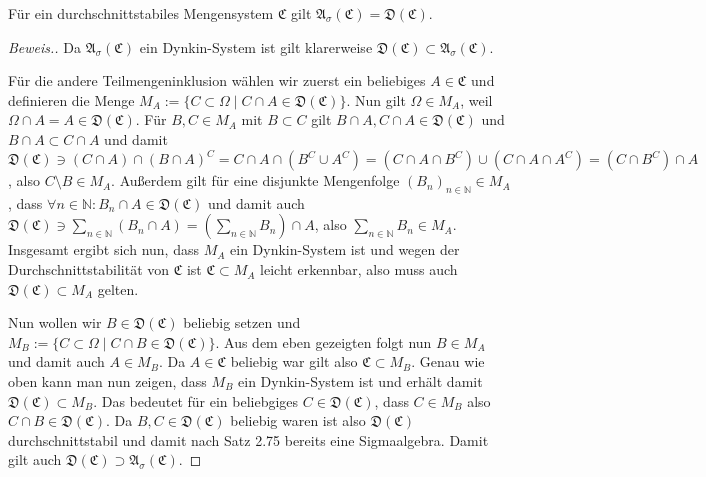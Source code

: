 \begin{lemma}
    Für ein durchschnittstabiles Mengensystem $\mathfrak{C}$ gilt $\mathfrak{A}_\sigma(\mathfrak{C})=\mathfrak{D}(\mathfrak{C})$.
\end{lemma}

\begin{proof}[Beweis.]
    Da $\mathfrak{A}_\sigma(\mathfrak{C})$ ein Dynkin-System ist gilt klarerweise $\mathfrak{D}(\mathfrak{C})\subset \mathfrak{A}_\sigma(\mathfrak{C})$.

    Für die andere Teilmengeninklusion wählen wir zuerst ein beliebiges $A\in\mathfrak{C}$ und definieren die Menge $M_A:=\{C\subset\Omega\mid C\cap A\in\mathfrak{D}(\mathfrak{C})\}$. Nun gilt $\Omega\in M_A$, weil $\Omega\cap A=A\in\mathfrak{D}(\mathfrak{C})$. Für $B,C\in M_A$ mit $B\subset C$ gilt $B\cap A,C\cap A\in\mathfrak{D}(\mathfrak{C})$ und $B\cap A\subset C\cap A$ und damit $\mathfrak{D}(\mathfrak{C})\ni(C\cap A)\cap(B\cap A)^C=C\cap A\cap(B^C\cup A^C)=(C\cap A\cap B^C)\cup(C\cap A\cap A^C)=(C\cap B^C)\cap A$, also $C\setminus B\in M_A$. Außerdem gilt für eine disjunkte Mengenfolge $(B_n)_{n\in\mathbb{N}}\in M_A$, dass $\forall n\in\mathbb{N}:B_n\cap A\in\mathfrak{D}(\mathfrak{C})$ und damit auch $\mathfrak{D}(\mathfrak{C})\ni\sum_{n\in\mathbb{N}}\left(B_n\cap A\right)=\left(\sum_{n\in\mathbb{N}}B_n\right)\cap A$, also $\sum_{n\in\mathbb{N}}B_n\in M_A$. Insgesamt ergibt sich nun, dass $M_A$ ein Dynkin-System ist und wegen der Durchschnittstabilität von $\mathfrak{C}$ ist $\mathfrak{C}\subset M_A$ leicht erkennbar, also muss auch $\mathfrak{D}(\mathfrak{C})\subset M_A$ gelten. 
    
    Nun wollen wir $B\in\mathfrak{D}(\mathfrak{C})$ beliebig setzen und $M_B:=\{C\subset\Omega\mid C\cap B\in\mathfrak{D}(\mathfrak{C})\}$. Aus dem eben gezeigten folgt nun $B\in M_A$ und damit auch $A\in M_B$. Da $A\in\mathfrak{C}$ beliebig war gilt also $\mathfrak{C}\subset M_B$. Genau wie oben kann man nun zeigen, dass $M_B$ ein Dynkin-System ist und erhält damit $\mathfrak{D}(\mathfrak{C})\subset M_B$. Das bedeutet für ein beliebgiges $C\in\mathfrak{D}(\mathfrak{C})$, dass $C\in M_B$ also $C\cap B \in\mathfrak{D}(\mathfrak{C})$. Da $B,C\in\mathfrak{D}(\mathfrak{C})$ beliebig waren ist also $\mathfrak{D}(\mathfrak{C})$ durchschnittstabil und damit nach Satz 2.75 bereits eine Sigmaalgebra. Damit gilt auch \cite{zbMATH06257850} $\mathfrak{D}(\mathfrak{C})\supset \mathfrak{A}_\sigma(\mathfrak{C})$.
\end{proof}